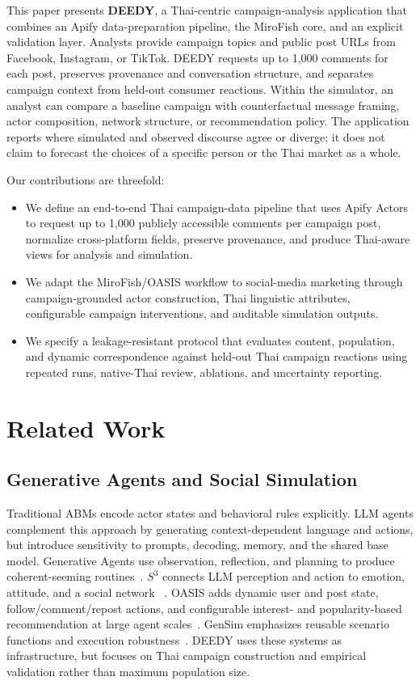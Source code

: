 \documentclass[conference]{IEEEtran}
\begin{document}
This paper presents \textbf{DEEDY}, a Thai-centric campaign-analysis
application that combines an Apify data-preparation pipeline, the MiroFish core,
and an explicit validation layer. Analysts provide campaign topics and public
post URLs from Facebook, Instagram, or TikTok. DEEDY requests up to 1,000
comments for each post, preserves provenance and conversation structure, and
separates campaign context from held-out consumer reactions. Within the
simulator, an analyst can compare a baseline campaign with counterfactual
message framing, actor composition, network structure, or recommendation
policy. The application reports where simulated and observed discourse agree
or diverge; it does not claim to forecast the choices of a specific person or
the Thai market as a whole.

Our contributions are threefold:
\begin{itemize}
    \item We define an end-to-end Thai campaign-data pipeline that uses Apify
    Actors to request up to 1,000 publicly accessible comments per campaign
    post, normalize cross-platform fields, preserve provenance, and produce
    Thai-aware views for analysis and simulation.
    \item We adapt the MiroFish/OASIS workflow to social-media marketing through
    campaign-grounded actor construction, Thai linguistic attributes,
    configurable campaign interventions, and auditable simulation outputs.
    \item We specify a leakage-resistant protocol that evaluates content,
    population, and dynamic correspondence against held-out Thai campaign
    reactions using repeated runs, native-Thai review, ablations, and
    uncertainty reporting.
\end{itemize}

\section{Related Work}

\subsection{Generative Agents and Social Simulation}

Traditional ABMs encode actor states and behavioral rules explicitly. LLM
agents complement this approach by generating context-dependent language and
actions, but introduce sensitivity to prompts, decoding, memory, and the shared
base model. Generative Agents use observation, reflection, and planning to
produce coherent-seeming routines~\cite{park2023generative}. $S^3$ connects LLM
perception and action to emotion, attitude, and a social network
~\cite{gao2023s3}. OASIS adds dynamic user and post state, follow/comment/repost
actions, and configurable interest- and popularity-based recommendation at
large agent scales~\cite{yang2024oasis}. GenSim emphasizes reusable scenario
functions and execution robustness~\cite{tang2025gensim}. DEEDY uses these
systems as infrastructure, but focuses on Thai campaign construction and
empirical validation rather than maximum population size.
\end{document}
